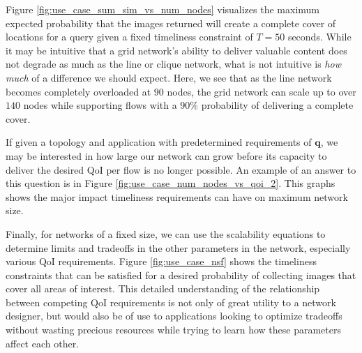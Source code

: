 Figure \ref{fig:use_case_sum_sim_vs_num_nodes} visualizes the maximum expected probability that the images returned will create a complete cover of locations for a query given a fixed timeliness constraint of $T=50$ seconds. 
While it may be intuitive that a grid network's ability to deliver valuable content does not degrade as much as the line or clique network, what is not intuitive is \emph{how much} of a difference we should expect. Here, we see that as the line network becomes completely overloaded at $90$ nodes, the grid network can scale up to over $140$ nodes while supporting flows with a $90\%$ probability of delivering a complete cover.

If given a topology and application with predetermined requirements of $\mathbf{q}$, we may be interested in how large our network can grow before its capacity to deliver the desired QoI per flow is no longer possible. An example of an answer to this question is in Figure \ref{fig:use_case_num_nodes_vs_qoi_2}.  This graphs shows the major impact timeliness requirements can have on maximum network size.

Finally, for networks of a fixed size, we can use the scalability equations to determine limits and tradeoffs in the other parameters in the network, especially various QoI requirements. Figure \ref{fig:use_case_nsf} shows the timeliness constraints that can be satisfied for a desired probability of collecting images that cover all areas of interest. This detailed understanding of the relationship between competing QoI requirements is not only of great utility to a network designer, but would also be of use to applications looking to optimize tradeoffs without wasting precious resources while trying to learn how these parameters affect each other. 




